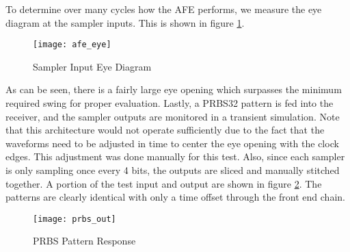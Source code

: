 To determine over many cycles how the AFE performs, we measure the eye diagram at the sampler inputs. This is shown in figure \ref{fig:eye}.
\begin{figure}[h]
\centering
\texttt{[image: afe\_eye]}
\caption{Sampler Input Eye Diagram}
\label{fig:eye}
\end{figure}
As can be seen, there is a fairly large eye opening which surpasses the minimum required swing for proper evaluation.
\clearpage
Lastly, a PRBS32 pattern is fed into the receiver, and the sampler outputs are monitored in a transient simulation. Note that this architecture would not operate sufficiently due to the fact that the waveforms need to be adjusted in time to center the eye opening with the clock edges. This adjustment was done manually for this test. Also, since each sampler is only sampling once every 4 bits, the outputs are sliced and manually stitched together. A portion of the test input and output are shown in figure \ref{fig:prbs}. The patterns are clearly identical with only a time offset through the front end chain.
\begin{figure}[h]
\centering
\texttt{[image: prbs\_out]}
\caption{PRBS Pattern Response}
\label{fig:prbs}
\end{figure}
\clearpage
